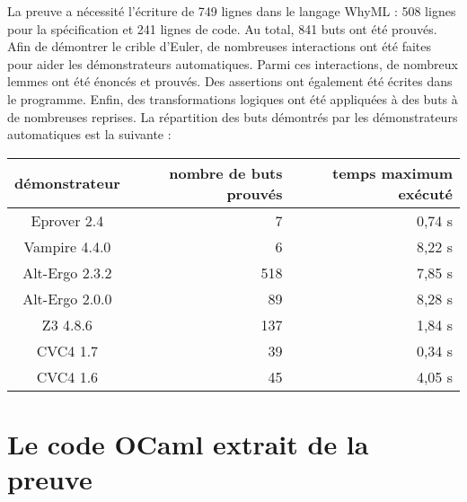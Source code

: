 \documentclass[a4paper]{easychair}
\begin{document}
La preuve a nécessité l'écriture de 749 lignes dans le langage WhyML :
508 lignes pour la spécification et 241 lignes de code.
Au total, 841 buts ont été prouvés.
Afin de démontrer le crible d'Euler, de nombreuses interactions ont été
faites pour aider les démonstrateurs automatiques.
Parmi ces interactions, de nombreux lemmes ont été énoncés et prouvés.
Des assertions ont également été écrites dans le programme.
Enfin, des transformations logiques ont  été appliquées à des buts à
de nombreuses reprises.
La répartition des buts démontrés par les démonstrateurs automatiques est la
suivante :
\begin{center}
  \begin{tabular}{|c|r|r|}
    \hline
    démonstrateur & nombre de buts prouvés & temps maximum exécuté \\
    \hline\hline
    Eprover 2.4    &     7 &      0,74 s \\\hline
    Vampire 4.4.0  &     6 &      8,22 s \\\hline
    Alt-Ergo 2.3.2 &   518 &      7,85 s \\\hline
    Alt-Ergo 2.0.0 &    89 &      8,28 s \\\hline
    Z3 4.8.6       &   137 &      1,84 s \\\hline
    CVC4 1.7       &    39 &      0,34 s \\\hline
    CVC4 1.6       &    45 &      4,05 s \\\hline
  \end{tabular}
\end{center}


\section{Le code OCaml extrait de la preuve}
\label{sec:extraction}
\end{document}
